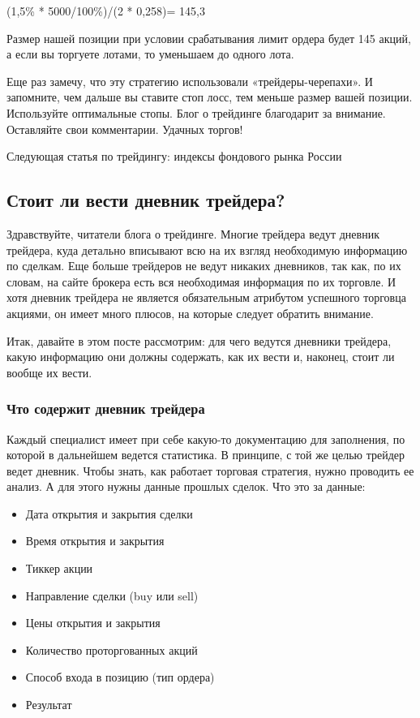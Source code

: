 \documentclass{book}
\begin{document}
(1,5\% * 5000/100\%)/(2 * 0,258)= 145,3

Размер нашей позиции при условии срабатывания лимит ордера будет 145 акций, а если вы торгуете лотами, то уменьшаем до одного лота.

Еще раз замечу, что эту стратегию использовали «трейдеры-черепахи». И запомните, чем дальше вы ставите стоп лосс, тем меньше размер вашей позиции. Используйте оптимальные стопы. Блог о трейдинге благодарит за внимание. Оставляйте свои комментарии. Удачных торгов!


Следующая статья по трейдингу: индексы фондового рынка России

\subsection{Стоит ли вести дневник трейдера?}

Здравствуйте, читатели блога о трейдинге. Многие трейдера ведут дневник трейдера, куда детально вписывают всю на их взгляд необходимую информацию по сделкам. Еще больше трейдеров не ведут никаких дневников, так как, по их словам, на сайте брокера есть вся необходимая информация по их торговле. И хотя дневник трейдера не является обязательным атрибутом успешного торговца акциями, он имеет много плюсов, на которые следует обратить внимание.

Итак, давайте в этом посте рассмотрим: для чего ведутся дневники
трейдера, какую информацию они должны содержать, как их вести и,
наконец, стоит ли вообще их вести.

\subsubsection{Что содержит дневник трейдера}

Каждый специалист имеет при себе какую-то документацию для заполнения, по которой в дальнейшем ведется статистика. В принципе, с той же целью трейдер ведет дневник. Чтобы знать, как работает торговая стратегия, нужно проводить ее анализ. А для этого нужны данные прошлых сделок. Что это за данные:
\begin{itemize}
\item     Дата открытия и закрытия сделки
\item     Время открытия и закрытия
\item     Тиккер акции
\item     Направление сделки (buy или sell)
\item     Цены открытия и закрытия
\item     Количество проторгованных акций
\item     Способ входа в позицию (тип ордера)
\item     Результат
\end{itemize}
\end{document}
